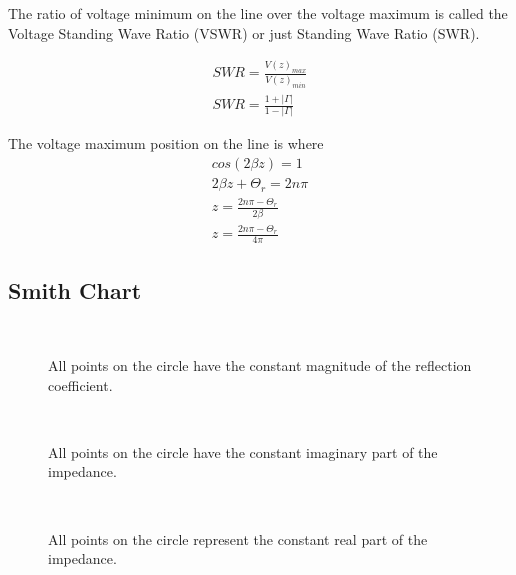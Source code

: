 \begin{itemize}
The ratio of voltage minimum on the line over the voltage maximum is
called the Voltage Standing Wave Ratio (VSWR) or just Standing Wave
Ratio (SWR).

\begin{eqnarray}
SWR=\frac{V(z)_{max}}{ V(z)_{min}} \nonumber \\
SWR=\frac{1+|\Gamma|}{1-|\Gamma|}
\end{eqnarray}

The voltage maximum position on the line is where
\begin{eqnarray}
cos(2 \beta z)=1 \nonumber \\
2 \beta z + \Theta_r = 2 n \pi \nonumber \\
z =\frac{ 2 n \pi -\Theta_r }{ 2 \beta} \nonumber \\
z=\frac{ 2 n \pi -\Theta_r }{ 4 \pi}
\end{eqnarray}



\end{itemize}

\newpage



\subsection{Smith Chart}




\begin{figure}[htbp]
\begin{center}
\strut{} \\
\end{center}
\caption{All points on the circle have the constant magnitude of the reflection coefficient.}
\label{wind}
\end{figure}



\begin{figure}[htbp]
\begin{center}
\strut{} \\
\end{center}
\caption{All points on the circle have the constant imaginary part of the impedance.}
\label{wind}
\end{figure}



\begin{figure}[htbp]
\begin{center}
\strut{} \\
\end{center}
\caption{All points on the circle represent the constant real part of the impedance.}
\label{wind}
\end{figure}

